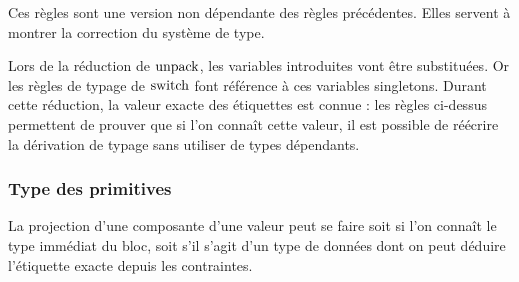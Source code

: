 \begin{mathpar}
%




%
\end{mathpar}
%
Ces règles sont une version non dépendante des règles précédentes. Elles
servent à montrer la correction du système de type.

Lors de la réduction de $\kw{unpack}$, les variables introduites vont être
substituées. Or les règles de typage de $\kw{switch}$ font référence à ces
variables singletons. Durant cette réduction, la valeur exacte des étiquettes
est connue : les règles ci-dessus permettent de prouver que si l'on connaît
cette valeur, il est possible de réécrire la dérivation de typage sans utiliser
de types dépendants.

\subsubsection{Type des primitives}

\begin{mathpar}

\end{mathpar}
%
La projection d'une composante d'une valeur peut se faire soit si l'on connaît
le type immédiat du bloc, soit s'il s'agit d'un type de données dont on peut
déduire l'étiquette exacte depuis les contraintes.

